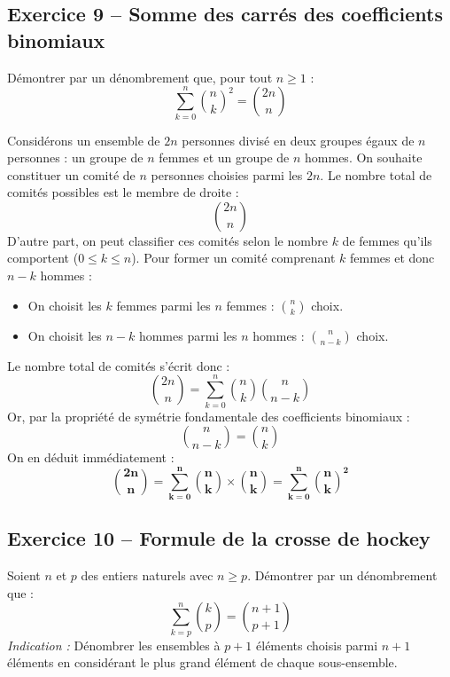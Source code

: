 \documentclass[11pt,a4paper]{article}
\begin{document}
\vspace{0.3cm}

\subsection*{Exercice 9 -- Somme des carrés des coefficients binomiaux}

Démontrer par un dénombrement que, pour tout $n \ge 1$ :
\[
\sum_{k=0}^n \binom{n}{k}^2 = \binom{2n}{n}
\]

\begin{correctionbox}
Considérons un ensemble de $2n$ personnes divisé en deux groupes égaux de $n$ personnes : un groupe de $n$ femmes et un groupe de $n$ hommes.
On souhaite constituer un comité de $n$ personnes choisies parmi les $2n$.
Le nombre total de comités possibles est le membre de droite :
\[
\binom{2n}{n}
\]
D'autre part, on peut classifier ces comités selon le nombre $k$ de femmes qu'ils comportent ($0 \le k \le n$).
Pour former un comité comprenant $k$ femmes et donc $n - k$ hommes :
\begin{itemize}[label=$\bullet$]
    \item On choisit les $k$ femmes parmi les $n$ femmes : $\binom{n}{k}$ choix.
    \item On choisit les $n - k$ hommes parmi les $n$ hommes : $\binom{n}{n-k}$ choix.
\end{itemize}
Le nombre total de comités s'écrit donc :
\[
\binom{2n}{n} = \sum_{k=0}^n \binom{n}{k} \binom{n}{n-k}
\]
Or, par la propriété de symétrie fondamentale des coefficients binomiaux :
\[
\binom{n}{n-k} = \binom{n}{k}
\]
On en déduit immédiatement :
\[
\mathbf{\binom{2n}{n} = \sum_{k=0}^n \binom{n}{k} \times \binom{n}{k} = \sum_{k=0}^n \binom{n}{k}^2}
\]
\end{correctionbox}

\vspace{0.3cm}

\subsection*{Exercice 10 -- Formule de la crosse de hockey}

Soient $n$ et $p$ des entiers naturels avec $n \ge p$. Démontrer par un dénombrement que :
\[
\sum_{k=p}^n \binom{k}{p} = \binom{n+1}{p+1}
\]
\emph{Indication :} Dénombrer les ensembles à $p+1$ éléments choisis parmi $n+1$ éléments en considérant le plus grand élément de chaque sous-ensemble.
\end{document}
